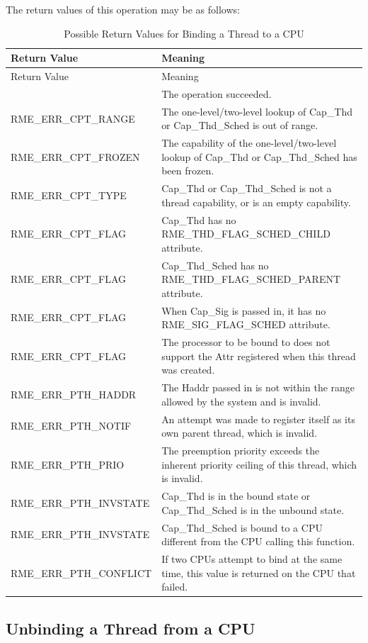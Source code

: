 The return values of this operation may be as follows:

\begin{xltabular}{\textwidth}{@{}>{\hsize\raggedright\arraybackslash}X>{\hsize\raggedright\arraybackslash}X@{}}
\caption{Possible Return Values for Binding a Thread to a CPU}\label{tab:4-25-bind-thread-to-cpu-return-values}\\
\toprule
Return Value & Meaning\tabularnewline
\endfirsthead
\toprule
Return Value & Meaning\tabularnewline
\midrule
\endhead
\bottomrule
{} & The operation succeeded.\tabularnewline
    RME\_ERR\_CPT\_RANGE & The one-level/two-level lookup of Cap\_Thd or Cap\_Thd\_Sched is out of range.\tabularnewline
    RME\_ERR\_CPT\_FROZEN & The capability of the one-level/two-level lookup of Cap\_Thd or Cap\_Thd\_Sched has been frozen.\tabularnewline
    RME\_ERR\_CPT\_TYPE & Cap\_Thd or Cap\_Thd\_Sched is not a thread capability, or is an empty capability.\tabularnewline
    RME\_ERR\_CPT\_FLAG & Cap\_Thd has no RME\_THD\_FLAG\_SCHED\_CHILD attribute.\tabularnewline
    RME\_ERR\_CPT\_FLAG & Cap\_Thd\_Sched has no RME\_THD\_FLAG\_SCHED\_PARENT attribute.\tabularnewline
    RME\_ERR\_CPT\_FLAG & When Cap\_Sig is passed in, it has no RME\_SIG\_FLAG\_SCHED attribute.\tabularnewline
    RME\_ERR\_CPT\_FLAG & The processor to be bound to does not support the Attr registered when this thread was created.\tabularnewline
    RME\_ERR\_PTH\_HADDR & The Haddr passed in is not within the range allowed by the system and is invalid.\tabularnewline
    RME\_ERR\_PTH\_NOTIF & An attempt was made to register itself as its own parent thread, which is invalid.\tabularnewline
    RME\_ERR\_PTH\_PRIO & The preemption priority exceeds the inherent priority ceiling of this thread, which is invalid.\tabularnewline
    RME\_ERR\_PTH\_INVSTATE & Cap\_Thd is in the bound state or Cap\_Thd\_Sched is in the unbound state.\tabularnewline
    RME\_ERR\_PTH\_INVSTATE & Cap\_Thd\_Sched is bound to a CPU different from the CPU calling this function.\tabularnewline
    RME\_ERR\_PTH\_CONFLICT & If two CPUs attempt to bind at the same time, this value is returned on the CPU that failed.\tabularnewline
\end{xltabular}
\nopagebreak[4]

\subsection{Unbinding a Thread from a CPU}\label{subsec:4-unbind-a-thread-from-a-cpu}

